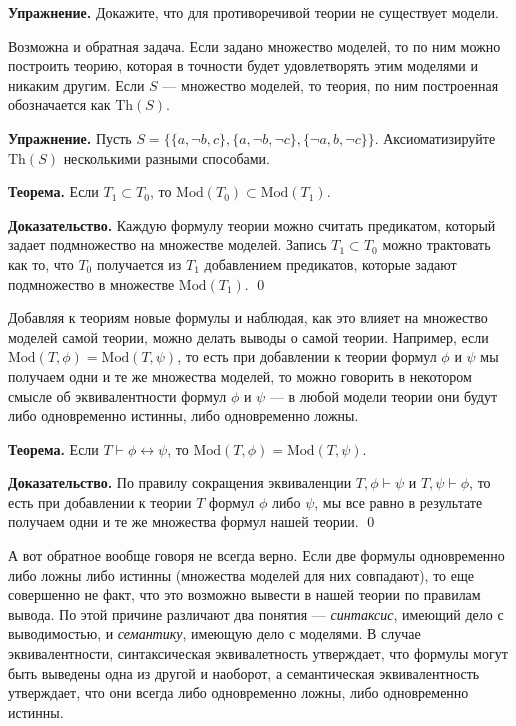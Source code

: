 {\bfseries Упражнение.} Докажите, что для противоречивой теории не существует модели.

Возможна и обратная задача. Если задано множество моделей, то по ним можно построить теорию, которая в точности будет удовлетворять этим моделями и никаким другим. Если $S$ — множество моделей, то теория, по ним построенная обозначается как $\mathrm{Th}(S)$.

{\bfseries Упражнение.} Пусть $S = \{\{a, \neg b, c\}, \{a, \neg b, \neg c\}, \{\neg a, b, \neg c\}\}$. Аксиоматизируйте $\mathrm{Th}(S)$ несколькими разными способами.

{\bfseries Теорема.} Если $T_1 \subset T_0$, то $\mathrm{Mod}(T_0) \subset \mathrm{Mod}(T_1)$.

{\bfseries Доказательство.} Каждую формулу теории можно считать предикатом, который задает подмножество на множестве моделей. Запись $T_1 \subset T_0$ можно трактовать как то, что $T_0$ получается из $T_1$ добавлением предикатов, которые задают подмножество в множестве $\mathrm{Mod}(T_1)$. \qed

Добавляя к теориям новые формулы и наблюдая, как это влияет на множество моделей самой теории, можно делать выводы о самой теории. Например, если $\mathrm{Mod}(T, \phi) = \mathrm{Mod}(T, \psi)$, то есть при добавлении к теории формул $\phi$ и $\psi$ мы получаем одни и те же множества моделей, то можно говорить в некотором смысле об эквивалентности формул $\phi$ и $\psi$ — в любой модели теории они будут либо одновременно истинны, либо одновременно ложны.

{\bfseries Теорема.} Если $T\vdash \phi \leftrightarrow \psi$, то $\mathrm{Mod}(T, \phi) = \mathrm{Mod}(T, \psi)$.

{\bfseries Доказательство.} По правилу сокращения эквиваленции $T, \phi\vdash \psi$ и $T, \psi \vdash \phi$, то есть при добавлении к теории $T$ формул $\phi$ либо $\psi$, мы все равно в результате получаем одни и те же множества формул нашей теории. \qed

А вот обратное вообще говоря не всегда верно. Если две формулы одновременно либо ложны либо истинны (множества моделей для них совпадают), то еще совершенно не факт, что это возможно вывести в нашей теории по правилам вывода. По этой причине различают два понятия — {\slshape синтаксис}, имеющий дело с выводимостью, и {\slshape семантику}, имеющую дело с моделями. В случае эквивалентности, синтаксическая эквивалетность утверждает, что формулы могут быть выведены одна из другой и наоборот, а семантическая эквивалентность утверждает, что они всегда либо одновременно ложны, либо одновременно истинны.

